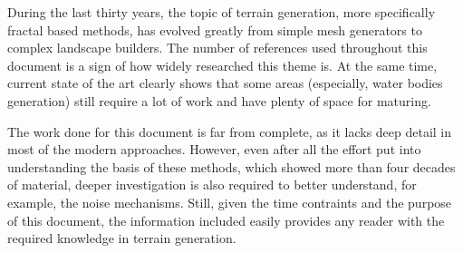 \documentclass{acmtog}
\begin{document}
During the last thirty years, the topic of terrain generation, more specifically fractal based methods, has evolved greatly from simple mesh generators to complex landscape builders. The number of references used throughout this document is a sign of how widely researched this theme is. At the same time, current state of the art clearly shows that some areas (especially, water bodies generation) still require a lot of work and have plenty of space for maturing.

The work done for this document is far from complete, as it lacks deep detail in most of the modern approaches. However, even after all the effort put into understanding the basis of these methods, which showed more than four decades of material, deeper investigation is also required to better understand, for example, the noise mechanisms. Still, given the time contraints and the purpose of this document, the information included easily provides any reader with the required knowledge in terrain generation.



\end{document}
